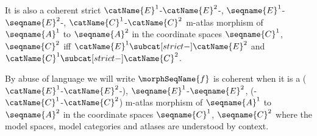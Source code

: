 \documentclass{article}
\begin{document}
\begin{definition}
It is also a coherent strict
\nobreaks
  {
    {$\catName{E}^1$-$\catName{E}^2$-},
    {$\seqname{E}^1$-$\seqname{E}^2$-},
    {$\catName{C}^1$-$\catName{C}^2$}
  }
m-atlas morphism of $\seqname{A}^1$ to $\seqname{A}^2$ in the
coordinate spaces $\seqname{C}^1$, $\seqname{C}^2$ iff
$\catName{E}^1 \subcat[strict-] \catName{E}^2$ and
$\catName{C}^1 \subcat[strict-] \catName{C}^2$.

By abuse of language we will write $\morphSeqName{f}$ is coherent when it
is a
\nobreaks
  {
    {($\catName{E}^1$-$\catName{E}^2$-)},
    {$\seqname{E}^1$-$\seqname{E}^2$},
    {(-$\catName{C}^1$-$\catName{C}^2$)}
  }
m-atlas morphism of $\seqname{A}^1$ to $\seqname{A}^2$ in the
coordinate spaces $\seqname{C}^1$, $\seqname{C}^2$ where the model
spaces, model categories and atlases are understood by context.
\end{definition}
\end{document}
